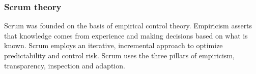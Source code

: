 \subsubsection{Scrum theory}


Scrum was founded on the basis of empirical control theory\cite{scrumguide11}. Empiricism
asserts that knowledge comes from experience and making decisions based on what is
known\cite{scrumguide11}. Scrum employs an iterative, incremental approach to optimize
predictability and control risk\cite{scrumguide11}. Scrum uses the three pillars of
empiricism, transparency, inspection and adaption\cite{scrumguide11}.




